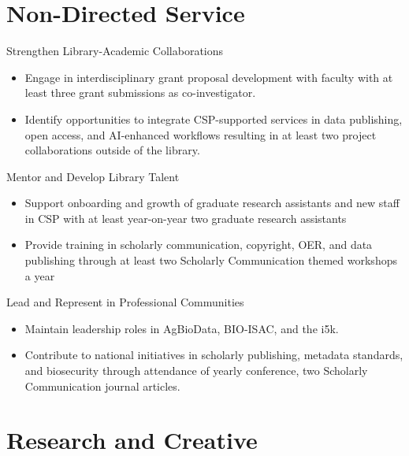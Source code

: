 \section{Non-Directed Service}

\LibraryEntry
  {}
  {Strengthen Library-Academic Collaborations}
  {}
  {}
  {}
  {
  \begin{itemize}
    \item Engage in interdisciplinary grant proposal development with faculty with at least three grant submissions as co-investigator.
    \item Identify opportunities to integrate CSP-supported services in data publishing, open access, and AI-enhanced workflows resulting in at least two project collaborations outside of the library.
  \end{itemize}
  }

\LibraryEntry
  {}
  {Mentor and Develop Library Talent}
  {}
  {}
  {}
  {
  \begin{itemize}
    \item Support onboarding and growth of graduate research assistants and new staff in CSP with at least year-on-year two graduate research assistants
    \item Provide training in scholarly communication, copyright, OER, and data publishing through at least two Scholarly Communication themed workshops a year
  \end{itemize}
  }

\LibraryEntry
  {}
  {Lead and Represent in Professional Communities}
  {}
  {}
  {}
  {
  \begin{itemize}
    \item Maintain leadership roles in AgBioData, BIO-ISAC, and the i5k.
    \item Contribute to national initiatives in scholarly publishing, metadata standards, and biosecurity through attendance of yearly conference, two Scholarly Communication journal articles.
  \end{itemize}
  }

\section{Research and Creative}

